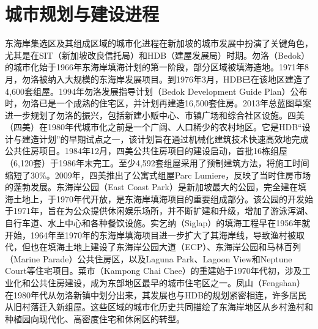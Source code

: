 \documentclass[11pt,a4paper,twoside,openany]{book}
\begin{document}
\section{城市规划与建设进程}
东海岸集选区及其组成区域的城市化进程在新加坡的城市发展中扮演了关键角色，尤其是在SIT（新加坡改良信托局）和HDB（建屋发展局）时期。勿洛（Bedok）的城市化始于1966年东海岸填海计划的第一阶段，部分区域被填海造地。1971年8月，勿洛被纳入大规模的东海岸发展项目。到1976年3月，HDB已在该地区建造了4,600套组屋。1994年勿洛发展指导计划（Bedok Development Guide Plan）公布时，勿洛已是一个成熟的住宅区，并计划再建造16,500套住房。2013年总蓝图草案进一步规划了勿洛的振兴，包括新建小贩中心、市镇广场和综合社区设施。四美（四美）在1980年代城市化之前是一个广阔、人口稀少的农村地区。它是HDB“设计与建造计划”的早期试点之一，该计划旨在通过机械化建筑技术快速高效地完成公共住房项目。1984年12月，四美公共住房项目的建设启动，首批16栋组屋（6,120套）于1986年末完工。至少4,592套组屋采用了预制建筑方法，将施工时间缩短了30\%。2009年，四美推出了公寓式组屋Parc Lumiere，反映了当时住房市场的蓬勃发展。东海岸公园（East Coast Park）是新加坡最大的公园，完全建在填海土地上，于1970年代开放，是东海岸填海项目的重要组成部分。该公园的开发始于1971年，旨在为公众提供休闲娱乐场所，并不断扩建和升级，增加了游泳泻湖、自行车道、水上中心和各种餐饮设施。实乞纳（Siglap）的填海工程早在1956年就开始，1964年至1970年的东海岸填海项目进一步扩大了其海岸线，导致渔村被取代，但也在填海土地上建设了东海岸公园大道（ECP）、东海岸公园和马林百列（Marine Parade）公共住房区，以及Laguna Park、Lagoon View和Neptune Court等住宅项目。菜市（Kampong Chai Chee）的重建始于1970年代初，涉及工业化和公共住房建设，成为东部地区最早的城市住宅区之一。凤山（Fengshan）在1980年代从勿洛新镇中划分出来，其发展也与HDB的规划紧密相连，许多居民从旧村落迁入新组屋。这些区域的城市化历史共同描绘了东海岸地区从乡村渔村和种植园向现代化、高密度住宅和休闲区的转型。
\end{document}
